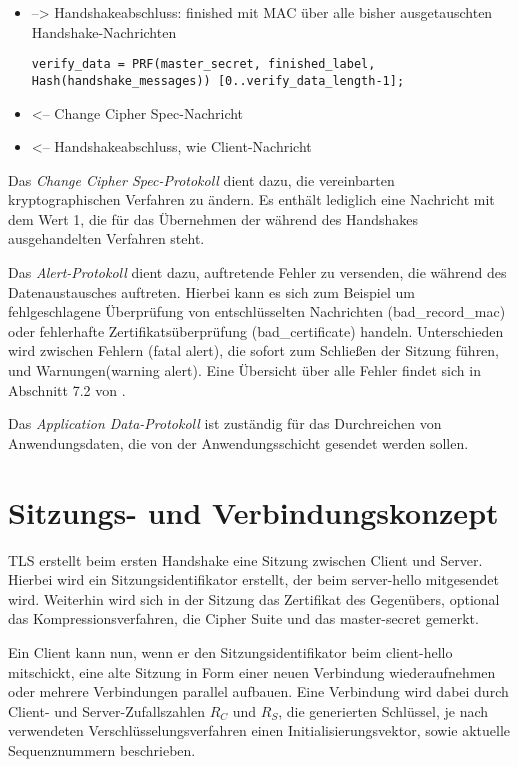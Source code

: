 \documentclass[
    12pt,
    headings=small,
    parskip=half,           %
    bibliography=totoc,
    numbers=noenddot,       %
    open=any,               %
   final                   %
    ]{scrreprt}
\newcommand{\mastersecret}		{master-secret}
\newcommand{\clienthello}			{client-hello}
\newcommand{\serverhello}			{server-hello}
\newcommand{\finished}				{finished}
\newcommand{\changecipherspec}	{Change Cipher Spec}
\newcommand{\badrecordmac}		{bad\_record\_mac}
\newcommand{\badcertificate}		{bad\_certificate}
\begin{document}
\begin{itemize}
\item --> Handshakeabschluss: \finished{} mit MAC über alle bisher ausgetauschten Handshake-Nachrichten 
\begin{lstlisting}
verify_data = PRF(master_secret, finished_label, Hash(handshake_messages)) [0..verify_data_length-1];
\end{lstlisting}

\item <-- \changecipherspec{}-Nachricht

\item <-- Handshakeabschluss, wie Client-Nachricht
\end{itemize}

Das \emph{Change Cipher Spec-Protokoll} dient dazu, die vereinbarten kryptographischen Verfahren zu ändern. Es enthält lediglich eine Nachricht mit dem Wert 1, die für das Übernehmen der während des Handshakes ausgehandelten Verfahren steht. 

Das \emph{Alert-Protokoll} dient dazu, auftretende Fehler zu versenden, die während des Datenaustausches auftreten. Hierbei kann es sich zum Beispiel um fehlgeschlagene Überprüfung von entschlüsselten Nachrichten (\badrecordmac{}) oder fehlerhafte Zertifikatsüberprüfung (\badcertificate{}) handeln. Unterschieden wird zwischen Fehlern (fatal alert), die sofort zum Schließen der Sitzung führen, und Warnungen(warning alert). Eine Übersicht über alle Fehler findet sich in Abschnitt 7.2 von \cite{tls12}.

Das \emph{Application Data-Protokoll} ist zuständig für das Durchreichen von Anwendungsdaten, die von der Anwendungsschicht gesendet werden sollen.

\section{Sitzungs- und Verbindungskonzept}

TLS erstellt beim ersten Handshake eine Sitzung zwischen Client und Server. Hierbei wird ein Sitzungsidentifikator erstellt, der beim \serverhello{} mitgesendet wird. Weiterhin wird sich in der Sitzung das Zertifikat des Gegenübers, optional das Kompressionsverfahren, die Cipher Suite und das \mastersecret{} gemerkt.

Ein Client kann nun, wenn er den Sitzungsidentifikator beim \clienthello{} mitschickt, eine alte Sitzung in Form einer neuen Verbindung wiederaufnehmen oder mehrere Verbindungen parallel aufbauen. Eine Verbindung wird dabei durch Client- und Server-Zufallszahlen \(R_C\) und \(R_S\), die generierten Schlüssel, je nach verwendeten Verschlüsselungsverfahren einen Initialisierungsvektor, sowie aktuelle Sequenznummern beschrieben.
\end{document}
